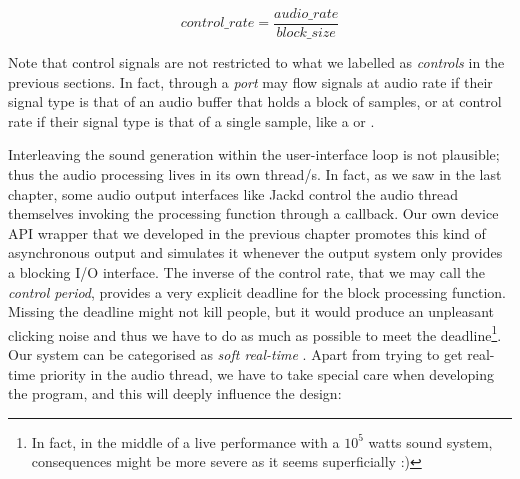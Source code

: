 \begin{equation}
  control\_rate = \frac{audio\_rate}{block\_size}  
\end{equation}

Note that control signals are not restricted to what we labelled as
\emph{controls} in the previous sections. In fact, through a
\emph{port} may flow signals at audio rate if their signal type is
that of an audio buffer that holds a block of samples, or at control
rate if their signal type is that of a single sample, like a
 or .

Interleaving the sound generation within the user-interface loop is
not plausible; thus the audio processing lives in its own thread/s. In
fact, as we saw in the last chapter, some audio output interfaces like
Jackd control the audio thread themselves invoking the processing
function through a callback. Our own device API wrapper that we
developed in the previous chapter promotes this kind of asynchronous
output and simulates it whenever the output system only provides a
blocking I/O interface. The inverse of the control rate, that we may
call the \emph{control period}, provides a very explicit deadline for
the block processing function. Missing the deadline might not kill
people, but it would produce an unpleasant clicking noise and thus we
have to do as much as possible to meet the deadline\footnote{In fact,
  in the middle of a live performance with a $10^5$ watts sound
  system, consequences might be more severe as it seems superficially
  :)}. Our system can be categorised as \emph{soft real-time}
\cite{tanenbaum07mos}. Apart from trying to get real-time priority in
the audio thread, we have to take special care when developing the
program, and this will deeply influence the design:

